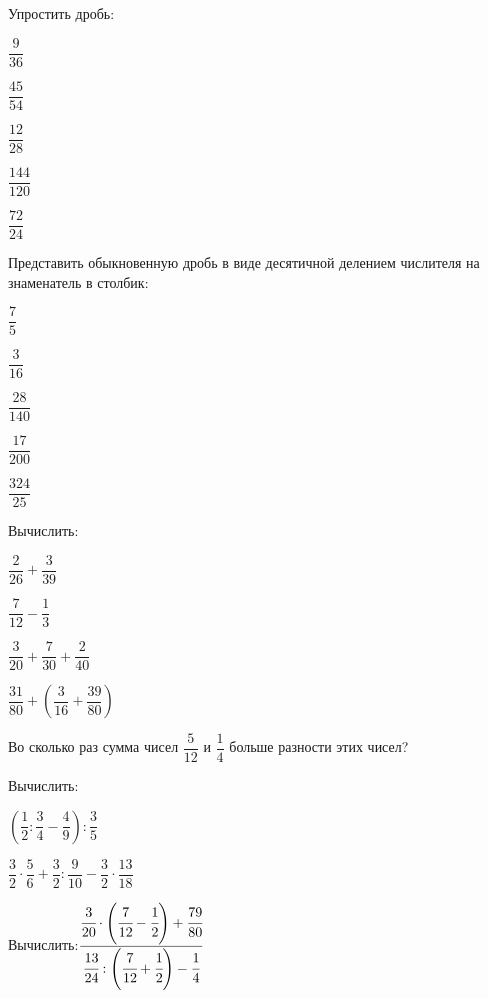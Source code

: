 \begin{listofex}
	\item Упростить дробь:
	\begin{enumcols}[itemcolumns=5]
		\item \( \dfrac{9}{36} \)
		\item \( \dfrac{45}{54} \)
		\item \( \dfrac{12}{28} \)
		\item \( \dfrac{144}{120} \)
		\item \( \dfrac{72}{24} \)
	\end{enumcols}
	\item Представить обыкновенную дробь в виде десятичной делением числителя на знаменатель в столбик:
	\begin{enumcols}[itemcolumns=5]
		\item \( \dfrac{7}{5} \)
		\item \( \dfrac{3}{16} \)
		\item \( \dfrac{28}{140} \)
		\item \( \dfrac{17}{200} \)
		\item \( \dfrac{324}{25} \)
	\end{enumcols}
	\item Вычислить:
	\begin{enumcols}[itemcolumns=4]
		\item \( \dfrac{2}{26}+\dfrac{3}{39} \)
		\item \( \dfrac{7}{12}-\dfrac{1}{3} \)
		\item \( \dfrac{3}{20}+\dfrac{7}{30}+\dfrac{2}{40} \)
		\item \( \dfrac{31}{80}+\left( \dfrac{3}{16}+\dfrac{39}{80} \right) \)
	\end{enumcols}
	\item Во сколько раз сумма чисел \( \dfrac{5}{12} \) и \( \dfrac{1}{4} \) больше разности этих чисел?
	\item Вычислить:
	\begin{enumcols}[itemcolumns=2]
		\item \( \left( \dfrac{1}{2}:\dfrac{3}{4}-\dfrac{4}{9} \right):\dfrac{3}{5} \)
		\item \( \dfrac{3}{2}\cdot\dfrac{5}{6}+\dfrac{3}{2}:\dfrac{9}{10}-\dfrac{3}{2}\cdot\dfrac{13}{18} \)
	\end{enumcols}
	\item Вычислить:\qquad\( \dfrac{\cfrac{3}{20}\cdot\left( \cfrac{7}{12}-\cfrac{1}{2} \right)+\cfrac{79}{80}}{\cfrac{13}{24}:\left( \cfrac{7}{12}+\cfrac{1}{2} \right)-\cfrac{1}{4}} \)

\end{listofex}
